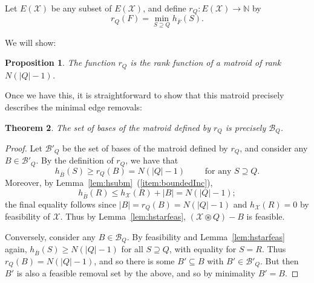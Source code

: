 \documentclass[11pt, letterpaper]{article}
\newtheorem{theorem}{Theorem}[section]
\newtheorem{proposition}[theorem]{Proposition}
\theoremstyle{definition}
\newcommand{\todo}[1]{}
\newcommand{\todo}[1]{{\color{blue}\emph{(#1)}}}
\newcommand{\grphx}{\mathcal{X}}
\newcommand{\slkx}{h_{\grphx}}
\newcommand{\slkF}{h_{\bar{F}}}
\newcommand{\slkB}{h_{\bar{B}}}
\newcommand{\remove}{-}
\newcommand{\contract}{\circledast}
\newcommand{\naturals}{\mathbb{N}}
\newcommand{\grd}{E(\grphx)}
\newcommand{\bases}[1]{\mathcal{B}'_{#1}}
\newcommand{\minrems}[1]{\mathcal{B}_{#1}}
\begin{document}
Let $\grd$ be any subset of $E(\grphx)$, and define
$r_Q : \grd \rightarrow \naturals$ by
\begin{equation}\label{eq:rank} r_Q(F) = \min_{S \supseteq Q} \slkF(S). 
\end{equation}
\todo{Maybe some explanation about $r_Q$, maybe a little further down, explaining some intuition why it makes sense that this is the rank function.}
We will show:
\begin{proposition}\label{prop:matroid}
	The function $r_Q$ is the rank function of a matroid of rank $N(|Q|-1)$. \end{proposition}
Once we have this, it is straightforward to show that this matroid precisely describes the minimal edge removals:
\begin{theorem}\label{thm:isMatroidAgain}
	The set of bases of the matroid defined by $r_Q$ is precisely $\minrems{Q}$.
\end{theorem}
\begin{proof}
	Let $\bases{Q}$ be the set of bases of the matroid defined by $r_Q$, and 
	consider any $B \in \bases{Q}$. 
	By the definition of $r_Q$, we have that 
	\[ \slkB(S) \geq r_Q(B) = N(|Q|-1) \qquad \text{ for any }S \supseteq Q. \]
	Moreover, by Lemma~\ref{lem:hsubm}~(\ref{item:boundedInc}),
	\[ \slkB(R) \leq \slkx(R) + |B| = N(|Q|-1); \]
	the final equality follows since $|B|=r_Q(B) = N(|Q|-1)$ and $\slkx(R) = 0$ by feasibility of $\grphx$. 
	Thus by Lemma~\ref{lem:hstarfeas}, $(\grphx \contract Q) \remove B$ is feasible.

	Conversely, consider any $B \in \minrems{Q}$. 
	By feasibility and Lemma~\ref{lem:hstarfeas} again, $\slkB(S) \geq N(|Q|-1)$ for all $S \supseteq Q$, with equality for $S = R$.
 Thus $r_Q(B) = N(|Q|-1)$, and so there is some $B' \subseteq B$ with $B' \in \bases{Q}$.
	But then $B'$ is also a feasible removal set by the above, and so by minimality $B'=B$.
\end{proof}
\end{document}
